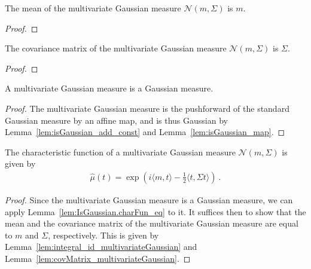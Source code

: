 \begin{lemma}\label{lem:integral_id_multivariateGaussian}
The mean of the multivariate Gaussian measure $\mathcal{N}(m, \Sigma)$ is $m$.
\end{lemma}

\begin{proof}  

\end{proof}


\begin{lemma}\label{lem:covMatrix_multivariateGaussian}
The covariance matrix of the multivariate Gaussian measure $\mathcal{N}(m, \Sigma)$ is $\Sigma$.
\end{lemma}

\begin{proof}  

\end{proof}


\begin{lemma}\label{lem:isGaussian_multivariateGaussian}
A multivariate Gaussian measure is a Gaussian measure.
\end{lemma}

\begin{proof}  
The multivariate Gaussian measure is the pushforward of the standard Gaussian measure by an affine map, and is thus Gaussian by Lemma~\ref{lem:isGaussian_add_const} and Lemma~\ref{lem:isGaussian_map}.
\end{proof}


\begin{theorem}\label{thm:charFun_multivariateGaussian}
The characteristic function of a multivariate Gaussian measure $\mathcal{N}(m, \Sigma)$ is given by
\begin{align*}
  \hat{\mu}(t) = \exp\left(i \langle m, t \rangle - \frac{1}{2} \langle t, \Sigma t \rangle\right)
  \: .
\end{align*}
\end{theorem}

\begin{proof}  
Since the multivariate Gaussian measure is a Gaussian measure, we can apply Lemma~\ref{lem:IsGaussian.charFun_eq} to it.
It suffices then to show that the mean and the covariance matrix of the multivariate Gaussian measure are equal to $m$ and $\Sigma$, respectively.
This is given by Lemma~\ref{lem:integral_id_multivariateGaussian} and Lemma~\ref{lem:covMatrix_multivariateGaussian}.
\end{proof}


